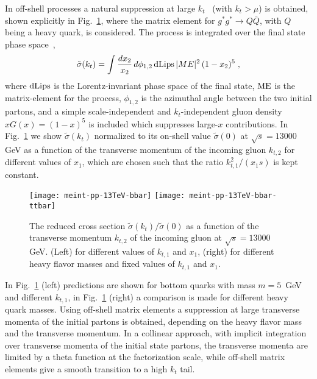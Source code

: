 \documentclass[11pt]{article} \usepackage{mystyle-new}
\def\prp{t}
\def\kt{\ensuremath{k_{\prp}}}
\begin{document}
In off-shell processes a natural suppression at large \kt\ \cite{Catani:1992rn} (with $\kt > \mu$)  is obtained, shown explicitly in Fig.~\ref{offshell}, where the matrix element for $g^* g^* \to Q\bar{Q}$, with $Q$ being a heavy quark, is considered. The process is integrated over the final state phase space~\cite{Marchesini:1992jw}, 
\begin{equation}
\tilde{\sigma}(\kt) = \int \frac{d x_2}{x_2}\, d \phi_{1,2}\,  {\rm d Lips}\, |ME|^2 \, (1-x_2)^5   \; , 
\end{equation} 
where ${\rm d Lips}$ is the Lorentz-invariant phase space of the final state, ${\rm ME}$ is the matrix-element for the process,  
$\phi_{1,2}$ is the azimuthal angle between the two initial partons, and a simple scale-independent and \kt -independent gluon density $xG(x)=(1-x)^5$ is included which suppresses 
large-$x$ contributions.  In Fig.~\ref{offshell} we show $\tilde{\sigma}(\kt)$ normalized to its on-shell value $\tilde{\sigma}(0)$  at $\sqrt{s}=13000$ GeV as a function of the transverse momentum of the incoming gluon $k_{t,2}$ 
for different values of $x_1$, which are chosen such that the ratio $k^2_{t,1}/ (x_1 s)$ is kept constant.

\begin{figure}[htb]
\begin{center} 
\texttt{[image: meint-pp-13TeV-bbar]}
\texttt{[image: meint-pp-13TeV-bbar-ttbar]}
\caption{The reduced cross section $\tilde{\sigma}(\kt)/ \tilde{\sigma}(0)$  as a function of the transverse momentum $k_{t,2}$ of the incoming gluon at $\sqrt{s} = 13000$ GeV. (Left) for different values of $k_{t,1}$ and $x_1$, (right) for different heavy flavor masses and
fixed values of $k_{t,1}$ and $x_1$. }
\label{offshell}
\end{center}
\end{figure} 

In Fig.~\ref{offshell} (left) predictions are shown for bottom quarks with mass $m=5$~GeV and different $k_{t,1}$, in Fig.~\ref{offshell} (right) 
a comparison is made for different heavy quark masses. Using off-shell matrix elements a suppression at large transverse momenta of the initial partons is obtained, depending on the heavy flavor mass and the transverse momentum. In a collinear approach, with implicit integration over transverse momenta of the initial state partons, the transverse momenta are limited by a theta function at the factorization scale, while off-shell matrix elements give a smooth transition to a high $k_t$ tail.
\end{document}
